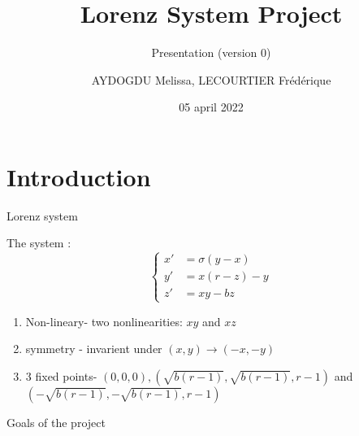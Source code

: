 \documentclass[10pt,xcolor={table,dvipsnames},t]{beamer}
\title[Your Short Title]{Lorenz System Project}
\subtitle{Presentation (version 0)}
\author[name]{AYDOGDU Melissa, LECOURTIER Frédérique}
\institute{\large Strasbourg University}
\date{05 april 2022}
\begin{document}
\begin{frame}
  \titlepage
\end{frame}




\section{Introduction}


\begin{frame}{Lorenz system}
    
    The system :
    $$\left\{\begin{aligned} 
    x'&=\sigma(y-x) \\
    y'&=x(r-z)-y \\
    z'&=xy-bz
    \end{aligned}\right.$$
    
    \begin{enumerate}
		\item Non-lineary- two nonlinearities: $xy$ and $xz$
		\item symmetry - invarient under $(x,y)\rightarrow(-x,-y) $
		\item 3 fixed points- $(0,0,0) ,(\sqrt{b(r-1)},\sqrt{b(r-1)},r-1)$ and $(-\sqrt{b(r-1)},-\sqrt{b(r-1)},r-1)$
	\end{enumerate}

\end{frame}
\begin{frame}{Goals of the project}
    

\end{frame}
\end{document}
